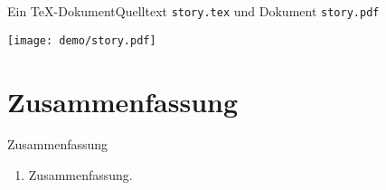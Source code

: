 \begin{Frame}[t]{Ein \TeX-Dokument}{Quelltext \texttt{story.tex} und Dokument \texttt{story.pdf}}
  

  \begin{center}
    \texttt{[image: demo/story.pdf]}
  \end{center}
\end{Frame}

\section*{Zusammenfassung}

\begin{frame}{Zusammenfassung}
  \begin{enumerate}
    \item Zusammenfassung.
  \end{enumerate}
\end{frame}